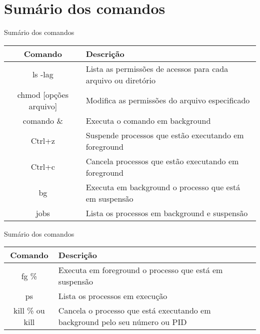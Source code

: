 \documentclass{beamer}
\begin{document}
\section*{Sumário dos comandos}

\begin{frame}{Sumário dos comandos}
\begin{center}
 \begin{tabular}{|| c | p{7cm}||} 
 \hline
 \textbf{Comando} & \textbf{Descri\c{c}ão}\\ [0.5ex] 
 \hline\hline
 ls -lag & Lista as permissões de acessos para cada arquivo ou diretório\\ 
 \hline
 chmod [op\c{c}ões arquivo] & Modifica as permissões do arquivo especificado\\
 \hline
 comando \& & Executa o comando em background\\
 \hline
 Ctrl+z & Suspende processos que estão executando em foreground\\
 \hline
 Ctrl+c & Cancela processos que estão executando em foreground\\
 \hline
 bg & Executa em background o processo que está em suspensão\\
 \hline
 jobs & Lista os processos em background e suspensão\\
 \hline
\end{tabular}
\end{center}
\end{frame}

\begin{frame}{Sumário dos comandos}
\begin{center}
 \begin{tabular}{|| c | p{9cm}||} 
 \hline
 \textbf{Comando} & \textbf{Descri\c{c}ão}\\ [0.5ex] 
 \hline\hline
 fg \% & Executa em foreground o processo que está em suspensão\\
 \hline
 ps & Lista os processos em execu\c{c}ão\\
 \hline
 kill \% ou kill & Cancela o processo que está executando em background pelo seu número ou PID\\
 \hline
\end{tabular}
\end{center}
\end{frame}
\end{document}
